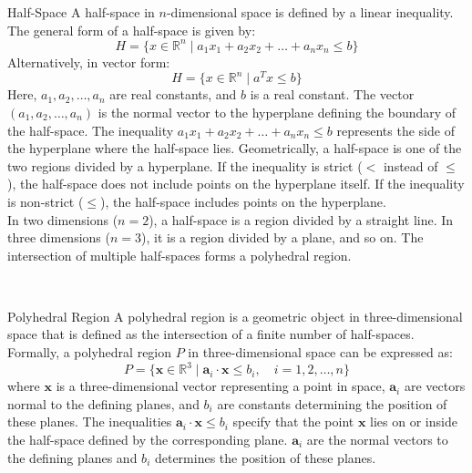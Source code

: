 \begin{definition}{Half-Space}
	A half-space in $n$-dimensional space is defined by a linear inequality. The general form of a half-space is given by:
	\begin{equation}
		H = \{x \in \mathbb{R}^n \mid a_1x_1 + a_2x_2 + \ldots + a_nx_n \leq b\}
	\end{equation}
	Alternatively, in vector form:
	\begin{equation}
		H = \{x \in \mathbb{R}^n \mid a^Tx \leq b\}
	\end{equation}
	Here, $a_1, a_2, \ldots, a_n$ are real constants, and $b$ is a real constant. The vector $(a_1, a_2, \ldots, a_n)$ is the normal vector to the hyperplane defining the boundary of the half-space. The inequality $a_1x_1 + a_2x_2 + \ldots + a_nx_n \leq b$ represents the side of the hyperplane where the half-space lies.
	Geometrically, a half-space is one of the two regions divided by a hyperplane. If the inequality is strict ($<$ instead of $\leq$), the half-space does not include points on the hyperplane itself. If the inequality is non-strict ($\leq$), the half-space includes points on the hyperplane. \\
	In two dimensions ($n = 2$), a half-space is a region divided by a straight line. In three dimensions ($n = 3$), it is a region divided by a plane, and so on. The intersection of multiple half-spaces forms a polyhedral region.
\end{definition}\\



\begin{definition}{Polyhedral Region}
	A polyhedral region is a geometric object in three-dimensional space that is defined as the intersection of a finite number of half-spaces. 
	Formally, a polyhedral region $P$ in three-dimensional space can be expressed as:
	\[ P = \{ \mathbf{x} \in \mathbb{R}^3 \mid \mathbf{a}_i \cdot \mathbf{x} \leq b_i, \quad i = 1, 2, \ldots, n \} \]
	where $\mathbf{x}$ is a three-dimensional vector representing a point in space, $\mathbf{a}_i$ are vectors normal to the defining planes, and $b_i$ are constants determining the position of these planes. The inequalities $\mathbf{a}_i \cdot \mathbf{x} \leq b_i$ specify that the point $\mathbf{x}$ lies on or inside the half-space defined by the corresponding plane. $\mathbf{a}_i$ are the normal vectors to the defining planes and $b_i$ determines the position of these planes.
\end{definition}\\

